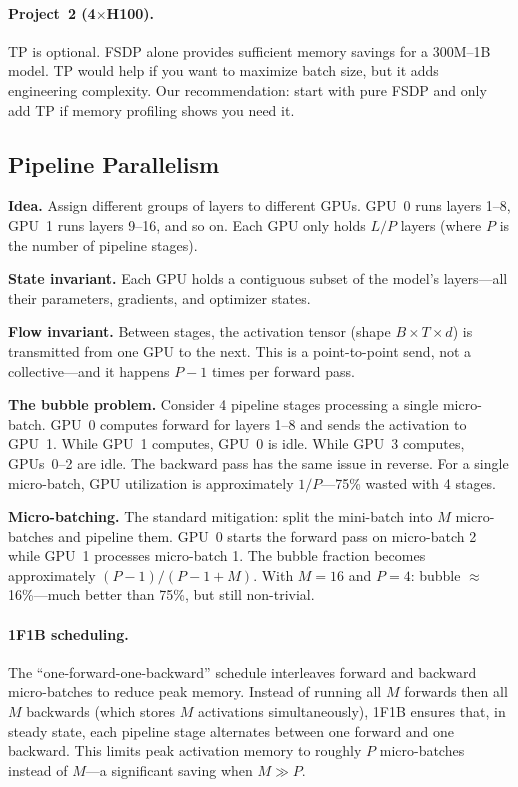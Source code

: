 \paragraph{Project~2 (4$\times$H100).} TP is optional. FSDP alone provides sufficient memory savings for a 300M--1B model. TP would help if you want to maximize batch size, but it adds engineering complexity. Our recommendation: start with pure FSDP and only add TP if memory profiling shows you need it.


\subsection{Pipeline Parallelism}
\label{sec:pipeline-parallelism}

\textbf{Idea.} Assign different groups of layers to different GPUs. GPU~0 runs layers 1--8, GPU~1 runs layers 9--16, and so on. Each GPU only holds $L/P$ layers (where $P$ is the number of pipeline stages).

\textbf{State invariant.} Each GPU holds a contiguous subset of the model's layers---all their parameters, gradients, and optimizer states.

\textbf{Flow invariant.} Between stages, the activation tensor (shape $B \times T \times d$) is transmitted from one GPU to the next. This is a point-to-point send, not a collective---and it happens $P-1$ times per forward pass.

\textbf{The bubble problem.} Consider 4 pipeline stages processing a single micro-batch. GPU~0 computes forward for layers 1--8 and sends the activation to GPU~1. While GPU~1 computes, GPU~0 is idle. While GPU~3 computes, GPUs~0--2 are idle. The backward pass has the same issue in reverse. For a single micro-batch, GPU utilization is approximately $1/P$---75\% wasted with 4 stages.

\textbf{Micro-batching.} The standard mitigation: split the mini-batch into $M$ micro-batches and pipeline them. GPU~0 starts the forward pass on micro-batch 2 while GPU~1 processes micro-batch 1. The bubble fraction becomes approximately $(P-1) / (P-1 + M)$. With $M = 16$ and $P = 4$: bubble $\approx$ 16\%---much better than 75\%, but still non-trivial.

\paragraph{1F1B scheduling.} The ``one-forward-one-backward'' schedule interleaves forward and backward micro-batches to reduce peak memory. Instead of running all $M$ forwards then all $M$ backwards (which stores $M$ activations simultaneously), 1F1B ensures that, in steady state, each pipeline stage alternates between one forward and one backward. This limits peak activation memory to roughly $P$ micro-batches instead of $M$---a significant saving when $M \gg P$.


